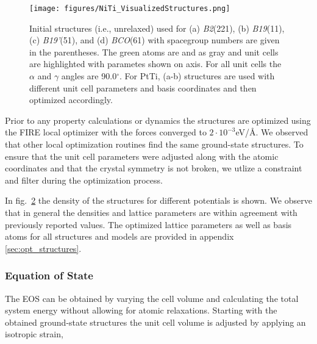 \documentclass[preprint,colorlinks=true,linkcolor=black,citecolor=black]{elsarticle}
\begin{document}
\begin{figure}[ht!]
  \begin{centering}
    \texttt{[image: figures/NiTi\_VisualizedStructures.png]}
    \caption{ Initial  structures (i.e., unrelaxed) used for
      (a) \textit{B2}(221), (b) \textit{B19}(11), (c)
      \textit{B19'}(51), and (d) \textit{BCO}(61) with spacegroup
      numbers are given in the parentheses. The green atoms are
       and  as gray and unit cells are highlighted with
      parametes shown on axis. For all unit cells the $\alpha$ and
      $\gamma$ angles are 90.0$^\circ$. For PtTi, (a-b) structures are
      used with different unit cell parameters and basis coordinates
      and then optimized accordingly.  }
    \label{fig:niti_structures}
  \end{centering}
\end{figure}

Prior to any property calculations or dynamics the structures are
optimized using the FIRE\cite{Bitzek2006} local optimizer with the
forces converged to $2\cdot 10^{-3}$eV/\AA. We observed that other
local optimization routines find the same ground-state structures. To
ensure that the unit cell parameters were adjusted along with the
atomic coordinates and that the crystal symmetry is not broken, we
utlize a constraint and filter during the optimization process. \par

In fig.~\ref{fig:opt_density} the density of the structures for
different potentials is shown. We observe that in general the
densities and lattice parameters are within agreement with previously
reported values. The optimized lattice parameters as well as basis
atoms for all structures and models are provided in appendix
\ref{sec:opt_structures}. \par

\begin{figure}[ht!]
  \label{fig:opt_density}
  \centering
  \caption{}
\end{figure}


\subsubsection{Equation of State}
The EOS can be obtained by varying the cell volume and calculating the
total system energy without allowing for atomic relaxations. Starting
with the obtained ground-state structures the unit cell volume is
adjusted by applying an isotropic strain,
\end{document}
